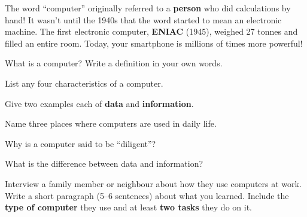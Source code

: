 \begin{funfact}
The word ``computer'' originally referred to a \textbf{person} who did calculations by hand! It wasn't until the 1940s that the word started to mean an electronic machine. The first electronic computer, \textbf{ENIAC} (1945), weighed 27 tonnes and filled an entire room. Today, your smartphone is millions of times more powerful!
\end{funfact}


\begin{reviewqs}
  \item What is a computer? Write a definition in your own words.
  \item List any four characteristics of a computer.
  \item Give two examples each of \textbf{data} and \textbf{information}.
  \item Name three places where computers are used in daily life.
  \item Why is a computer said to be ``diligent''?
  \item What is the difference between data and information?
\end{reviewqs}

\begin{challenge}
Interview a family member or neighbour about how they use computers at work. Write a short paragraph (5--6 sentences) about what you learned. Include the \textbf{type of computer} they use and at least \textbf{two tasks} they do on it.
\end{challenge}
